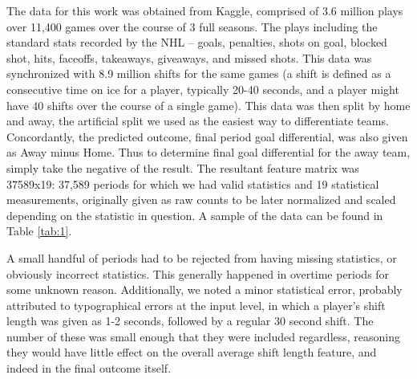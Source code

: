 \documentclass[twocolumn,letterpaper,12pt,notitlepage]{article}
\begin{document}
The data for this work was obtained from Kaggle, comprised of 3.6 million plays over 11,400 games over
the course of 3 full seasons. The plays including the standard stats recorded by the NHL – goals,
penalties, shots on goal, blocked shot, hits, faceoffs, takeaways, giveaways, and missed shots. This data
was synchronized with 8.9 million shifts for the same games (a shift is defined as a consecutive time on
ice for a player, typically 20-40 seconds, and a player might have 40 shifts over the course of a single
game). This data was then split by home and away, the artificial split we used as the easiest way to
differentiate teams. Concordantly, the predicted outcome, final period goal differential, was also given as
Away minus Home. Thus to determine final goal differential for the away team, simply take the negative
of the result. The resultant feature matrix was 37589x19: 37,589 periods for which we had valid
statistics and 19 statistical measurements, originally given as raw counts to be later normalized and
scaled depending on the statistic in question. A sample of the data can be found in Table \ref{tab:1}. \newline

A small handful of periods had to be rejected from having missing statistics, or obviously incorrect
statistics. This generally happened in overtime periods for some unknown reason. Additionally, we noted
a minor statistical error, probably attributed to typographical errors at the input level, in which a player’s
shift length was given as 1-2 seconds, followed by a regular 30 second shift. The number of these was
small enough that they were included regardless, reasoning they would have little effect on the overall
average shift length feature, and indeed in the final outcome itself.

\begin{table}[t]
  \centering
  \caption{NHL game data prepared sample}
  \label{tab:1}
\end{table}
\end{document}
